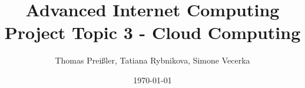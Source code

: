 \title{Advanced Internet Computing \\ Project Topic 3 - Cloud Computing }
\author{Thomas Preißler, Tatiana Rybnikova, Simone Vecerka}
\date{\today}

\maketitle
\thispagestyle{empty}


%
%
%
%
%
%
%
% 
%
%
%
%
%
%
%  
%
%
%  
%
%
%
%
%
